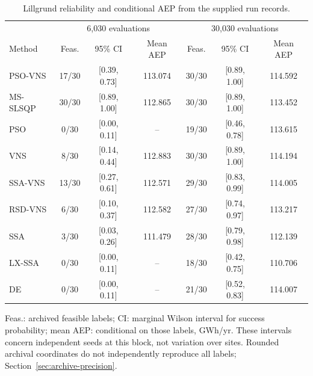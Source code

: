 \begin{table}[!htbp]
\centering
\caption{Lillgrund reliability and conditional AEP from the supplied run records.}
\label{tab:archive-reliability}
\small\setlength{\tabcolsep}{4pt}
\begin{tabular}{lcccccc}
\toprule
& \multicolumn{3}{c}{6,030 evaluations} & \multicolumn{3}{c}{30,030 evaluations} \\
Method & Feas. & 95\% CI & Mean AEP & Feas. & 95\% CI & Mean AEP \\
\midrule
PSO-VNS & 17/30 & [0.39, 0.73] & 113.074 & 30/30 & [0.89, 1.00] & 114.592 \\
MS-SLSQP & 30/30 & [0.89, 1.00] & 112.865 & 30/30 & [0.89, 1.00] & 113.452 \\
PSO & 0/30 & [0.00, 0.11] & -- & 19/30 & [0.46, 0.78] & 113.615 \\
VNS & 8/30 & [0.14, 0.44] & 112.883 & 30/30 & [0.89, 1.00] & 114.194 \\
SSA-VNS & 13/30 & [0.27, 0.61] & 112.571 & 29/30 & [0.83, 0.99] & 114.005 \\
RSD-VNS & 6/30 & [0.10, 0.37] & 112.582 & 27/30 & [0.74, 0.97] & 113.217 \\
SSA & 3/30 & [0.03, 0.26] & 111.479 & 28/30 & [0.79, 0.98] & 112.139 \\
LX-SSA & 0/30 & [0.00, 0.11] & -- & 18/30 & [0.42, 0.75] & 110.706 \\
DE & 0/30 & [0.00, 0.11] & -- & 21/30 & [0.52, 0.83] & 114.007 \\
\bottomrule
\end{tabular}
\par\smallskip\parbox{\textwidth}{\footnotesize Feas.: archived feasible labels; CI: marginal Wilson interval for success probability; mean AEP: conditional on those labels, GWh/yr. These intervals concern independent seeds at this block, not variation over sites. Rounded archival coordinates do not independently reproduce all labels; Section~\ref{sec:archive-precision}.}
\end{table}
